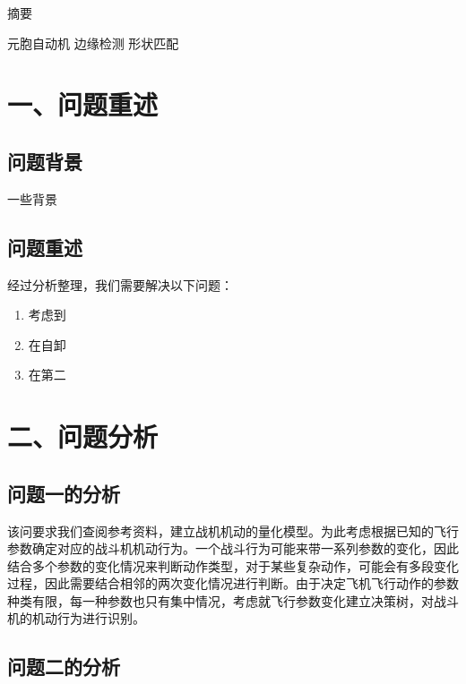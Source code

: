 \documentclass{my_paper}
\begin{document}
\newpage
\begin{center}
\lunwenbiaoti

\vspace{2ex}
\zhaiyao
\end{center}

摘要

\begin{guanjianci}
 元胞自动机 \quad 边缘检测 \quad 形状匹配
\end{guanjianci}

\newpage
\section{一、问题重述}

\subsection{问题背景}

一些背景

\subsection{问题重述}
经过分析整理，我们需要解决以下问题：
\begin{enumerate}
    \item 考虑到
    \item 在自卸
    \item 在第二
\end{enumerate}
\section{二、问题分析}
\subsection{问题一的分析}

该问要求我们查阅参考资料，建立战机机动的量化模型。为此考虑根据已知的飞行参数确定对应的战斗机机动行为。一个战斗行为可能来带一系列参数的变化，因此结合多个参数的变化情况来判断动作类型，对于某些复杂动作，可能会有多段变化过程，因此需要结合相邻的两次变化情况进行判断。由于决定飞机飞行动作的参数种类有限，每一种参数也只有集中情况，考虑就飞行参数变化建立决策树，对战斗机的机动行为进行识别。

\subsection{问题二的分析}
\end{document}
